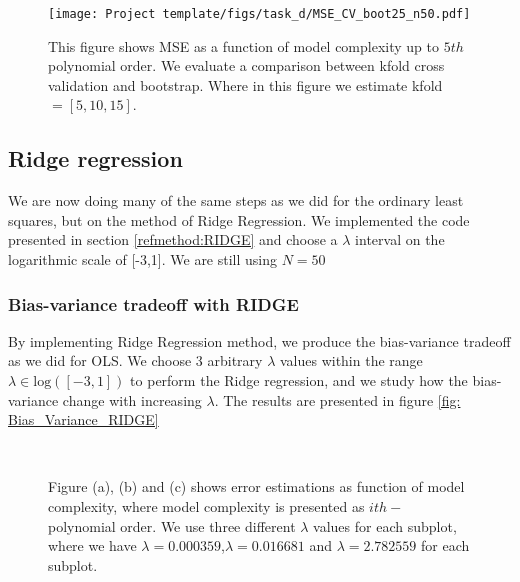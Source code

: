\documentclass[../main.tex]{subfiles}
\begin{document}
\begin{figure}[h!]
    \centering
    \texttt{[image: Project template/figs/task\_d/MSE\_CV\_boot25\_n50.pdf]}
    \caption{This figure shows MSE as a function of model complexity up to $5th$ polynomial order. We evaluate a comparison between kfold cross validation and bootstrap. Where in this figure we estimate kfold $= [5, 10, 15]$. }
    \label{fig:CV_MSE_kFOLD_N50}
\end{figure}
\vskip2in
\begin{flushleft}

\subsection{Ridge regression}\label{res:Ridge}
We are now doing many of the same steps as we did for the ordinary least squares, but on the method of Ridge Regression. We implemented the code presented in section \eqref{refmethod:RIDGE} and choose a $\lambda$ interval on the logarithmic scale of [-3,1]. We are still using $N=50$
\subsubsection{Bias-variance tradeoff with RIDGE}
By implementing Ridge Regression method, we produce the bias-variance tradeoff as we did for OLS. We choose 3 arbitrary $\lambda$ values within the range $\lambda \in \text{log}([-3,1])$ to perform the Ridge regression, and we study how the bias-variance change with increasing $\lambda$. The results are presented in figure \eqref{fig: Bias_Variance_RIDGE}


\begin{figure}[H]
\hspace*{-0.2in}
\\
\hspace*{1in}

\caption{Figure (a), (b) and (c) shows error estimations as function of model complexity, where model complexity is presented as $ith-$ polynomial order. We use three different $\lambda$ values for each subplot, where we have $\lambda = 0.000359$,$\lambda = 0.016681$ and $\lambda = 2.782559$ for each subplot.}
\label{fig: Bias_Variance_RIDGE}
\end{figure}







\end{flushleft}
\end{document}
